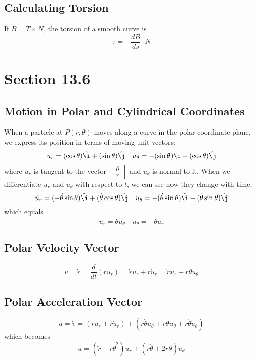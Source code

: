 \documentclass[12pt]{article}
\theoremstyle{break}
\numberwithin{theorem}{subsection}
\numberwithin{lemma}{subsection}
\numberwithin{corollary}{subsection}
\numberwithin{equation}{subsection}
\newcommand{\ihat}{\hat \i}
\newcommand{\jhat}{\hat \j}
\begin{document}
\subsection{Calculating Torsion}
If $B = T \times N$, the torsion of a smooth curve is 
\begin{equation*}
\tau = - \frac{dB}{ds} \cdot N
\end{equation*}

\section{Section 13.6}
\subsection{Motion in Polar and Cylindrical Coordinates}
When a particle at $P(r,\theta)$ moves along a curve in the polar coordinate plane, we express its
position in terms of moving unit vectors:
\begin{equation*}
u_r = (\cos \theta) \ihat + (\sin \theta) \jhat \quad u_\theta = -(\sin \theta)\ihat + (\cos \theta)\jhat
\end{equation*}
where $u_r$ is tangent to the vector $\begin{bmatrix} \theta \\ r \end{bmatrix}$ and $u_\theta$ is 
normal to it. When we differentiate $u_r$ and $u_\theta$ with respect to $t$, we can see how they 
change with time.
\begin{equation*}
\dot u_r = (-\dot{\theta}\sin \theta) \ihat + (\dot{\theta}\cos \theta) \jhat \quad 
u_\theta = -(\dot{\theta}\sin \theta) \ihat - (\dot{\theta}\sin \theta) \jhat
\end{equation*}
which equals 
\begin{equation*}
\dot u_r = \dot{\theta} u_\theta \quad u_\theta = -\dot{\theta} u_r
\end{equation*}

\subsection{Polar Velocity Vector}
\begin{equation*}
v = \dot r = \frac{d}{dt} \left( r u_r \right) = \dot r u_r + r \dot u_r = \dot r u_r + r \dot \theta u_\theta
\end{equation*}

\subsection{Polar Acceleration Vector}
\begin{equation*}
a = \dot v = (\ddot r u_r + \dot r \dot u_r) + 
(\dot r \dot \theta u_\theta + r \ddot \theta u_\theta + r \dot \theta \dot u_\theta)
\end{equation*}
which becomes 
\begin{equation*}
a = (\ddot r - r \dot \theta^2)u_r + (r \ddot \theta + 2 \dot r \dot \theta) u_\theta
\end{equation*}
\end{document}
